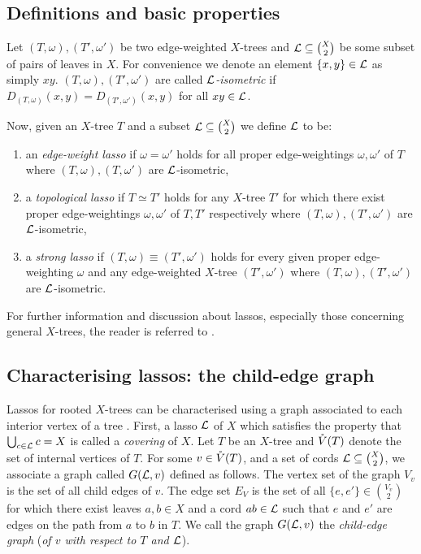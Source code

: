 \subsection{Definitions and basic properties}
\label{sec:defin-basic-prop}

Let $(T,\omega), (T',\omega')$ be two edge-weighted $X$-trees and ${\mathcal L}
\subseteq {X \choose 2}$ be some subset of pairs of leaves in $X$.  For
convenience we denote an element $\{x,y\} \in {\mathcal L}$ as simply $xy$.
$(T,\omega), (T',\omega')$ are called \textit{${\mathcal L}$-isometric} if
$D_{(T,\omega)}(x,y) = D_{(T',\omega')}(x,y)$ for all $xy \in {\mathcal L}$.

Now, given an $X$-tree $T$ and a subset ${\mathcal L} \subseteq {X \choose 2}$ we
define ${\mathcal L}$ to be:
\begin{enumerate}[label=(\roman*)]
\item an \textit{edge-weight lasso} if $\omega = \omega'$ holds for all proper
  edge-weightings $\omega,\omega'$ of $T$ where $(T,\omega),(T,\omega')$ are
  ${\mathcal L}$-isometric,
\item a \textit{topological lasso} if $T \simeq T'$ holds for any $X$-tree
  $T'$ for which there exist proper edge-weightings $\omega,\omega'$ of $T,T'$
  respectively where $(T,\omega),(T',\omega')$ are ${\mathcal L}$-isometric,
\item a \textit{strong lasso} if $(T,\omega) \equiv (T',\omega')$ holds for
  every given proper edge-weighting $\omega$ and any edge-weighted $X$-tree
  $(T',\omega')$ where $(T,\omega),(T',\omega')$ are ${\mathcal L}$-isometric.
\end{enumerate}

For further information and discussion about lassos, especially those
concerning general $X$-trees, the reader is referred to \citep{DHS11}.

\subsection{Characterising lassos: the child-edge graph}
\label{sec:lassoing-rooted-x}

Lassos for rooted $X$-trees can be characterised using a graph associated to
each interior vertex of a tree \citep{HP13}.  First, a lasso ${\mathcal L}$ of $X$
which satisfies the property that $\bigcup_{c \in {\mathcal L}} c = X$ is called a
\textit{covering} of $X$.  Let $T$ be an $X$-tree and $\mathring{V}(T)$ denote the set
of internal vertices of $T$.  For some $v \in \mathring{V}(T)$, and a set of cords ${\mathcal L}
\subseteq {X \choose 2}$, we associate a graph called $G({\mathcal L},v)$ defined as
follows.  The vertex set of the graph $V_v$ is the set of all child edges of
$v$.  The edge set $E_V$ is the set of all $\{e,e'\} \in {V_v \choose 2}$ for
which there exist leaves $a,b \in X$ and a cord $ab \in {\mathcal L}$ such that $e$ and
$e'$ are edges on the path from $a$ to $b$ in $T$.  We call the graph
$G({\mathcal L},v)$ the \textit{child-edge graph} (\textit{of $v$ with respect to $T$
  and ${\mathcal L}$}).

